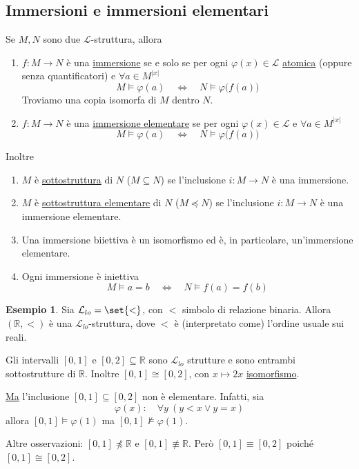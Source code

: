 \documentclass[10pt]{article}
\newcommand{\1}{\mathds{1}}
\newcommand{\R}{\mathds{R}}
\theoremstyle{definition}%
\newtheorem{esempio}[thm]{Esempio}
\theoremstyle{plain}
\theoremstyle{remark}
\begin{document}
\subsection{Immersioni e immersioni elementari}
\label{sec:org05f3c1b}

Se \(M,N\) sono due \(\mathcal{L}\)-struttura, allora
\begin{enumerate}
\item \(f:M\to N\) è una \uline{immersione} se e solo se per ogni \(\varphi(x) \in \mathcal{L}\) \uline{atomica} (oppure senza quantificatori) e \(\forall a \in M^{|x|}\)
\begin{equation*}
 	M\vDash\varphi(a)\quad\iff\quad N\vDash \varphi\big(f(a)\big)
\end{equation*}
Troviamo una copia isomorfa di \(M\) dentro \(N\).
\item \(f:M\to N\) è una \uline{immersione elementare} se per ogni \(\varphi(x) \in \mathcal{L}\) e \(\forall a \in M^{|x|}\)
\begin{equation*}
 	M\vDash\varphi(a)\quad\iff\quad N\vDash \varphi\big(f(a)\big)
\end{equation*}
\end{enumerate}

Inoltre
\begin{enumerate}
\item \(M\) è \uline{sottostruttura} di \(N\) (\(M \subseteq N\)) se l'inclusione \(i:M\to N\) è una immersione.
\item \(M\) è \uline{sottostruttura elementare} di \(N\) (\(M \preceq N\)) se l'inclusione \(i:M\to N\) è una immersione elementare.
\item Una immersione biiettiva è un isomorfismo ed è, in particolare, un'immersione elementare.
\item Ogni immersione è iniettiva
\begin{equation*}
 	M\vDash a=b\quad\iff\quad N\vDash f(a)=f(b)
\end{equation*}
\end{enumerate}

\begin{esempio}
Sia \(\mathcal{L}_{lo}=\set{<}\), con \(<\) simbolo di relazione binaria. Allora \((\R,<)\) è una \(\mathcal{L}_{lo}\)-struttura, dove \(<\) è (interpretato come) l'ordine usuale sui reali.

Gli intervalli \([0,1]\) e \([0,2] \subseteq \R\) sono \(\mathcal{L}_{lo}\) strutture e sono entrambi sottostrutture di \(\R\). Inoltre \([0,1]\cong [0,2]\), con \(x\mapsto 2x\) \href{../../../../org/roam/20250131103053-morfismo_tra_strutture_del_prim_ordine.org}{isomorfismo}.

\uline{Ma} l'inclusione \([0,1]\subseteq[0,2]\) non è elementare. Infatti, sia
\begin{equation*}
\varphi(x):\quad \forall y \ (y<x \lor y=x)
\end{equation*}
allora \([0,1]\vDash\varphi(1)\) ma \([0,1]\not\vDash\varphi(1)\).

Altre osservazioni: \([0,1]\not\preceq \R\) e \([0,1]\not\equiv \R\). Però \([0,1]\equiv[0,2]\) poiché \([0,1]\cong[0,2]\).
\end{esempio}
\end{document}
